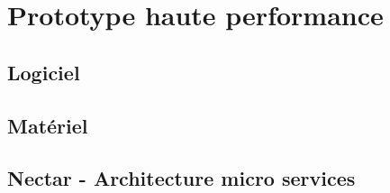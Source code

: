 \chapter{Prototype haute performance}
\label{chap:protoHP}

\section{Logiciel}

\section{Matériel}

\section{Nectar - Architecture micro services}